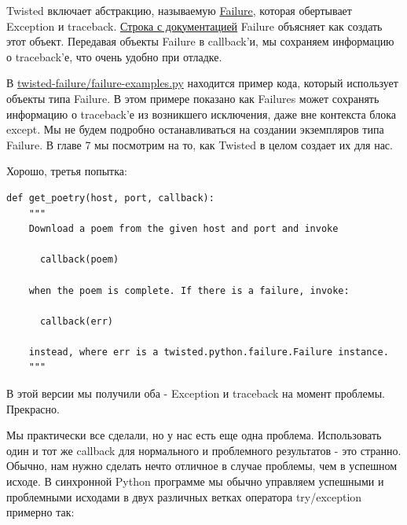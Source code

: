 Twisted включает абстракцию, называемую 
\href{http://twistedmatrix.com/trac/browser/tags/releases/twisted-8.2.0/twisted/python/failure.py#L121}{Failure}, 
которая 
обертывает Exception и traceback. 
\href{http://twistedmatrix.com/trac/browser/tags/releases/twisted-8.2.0/twisted/python/failure.py#L141}{Строка с документацией} 
Failure объясняет как создать этот объект. Передавая объекты Failure в 
callback'и, мы сохраняем информацию о traceback'е, что очень 
удобно при отладке.


В 
\href{http://github.com/jdavisp3/twisted-intro/blob/master/twisted-failure/failure-examples.py}{twisted-failure/failure-examples.py} 
находится пример кода, который использует объекты типа Failure. 
В этом примере показано как Failures может сохранять 
информацию о traceback'е из возникшего исключения, даже вне 
контекста блока except. Мы не будем подробно останавливаться на 
создании экземпляров типа Failure. В главе 7 мы посмотрим на то, 
как Twisted в целом создает их для нас.


Хорошо, третья попытка:

\begin{scriptsize}\begin{verbatim}
def get_poetry(host, port, callback):
    """
    Download a poem from the given host and port and invoke

      callback(poem)

    when the poem is complete. If there is a failure, invoke:

      callback(err)

    instead, where err is a twisted.python.failure.Failure instance.
    """
\end{verbatim}\end{scriptsize}


В этой версии мы получили оба - Exception и traceback на 
момент проблемы. Прекрасно.


Мы практически все сделали, но у нас есть еще одна проблема. 
Использовать один и тот же callback для нормального и проблемного  
результатов - это странно. Обычно, нам нужно сделать нечто отличное
 в случае проблемы, чем в успешном исходе. 
В синхронной Python программе мы обычно управляем успешными и 
проблемными исходами в двух различных ветках оператора try/exception 
примерно так:

